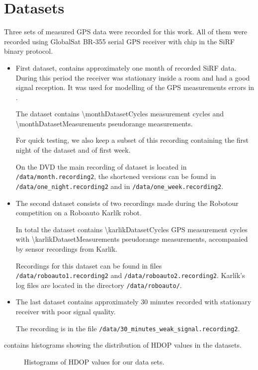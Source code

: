 \chapter{Datasets}
\label{chap:datasets}

Three sets of measured GPS data were recorded for this work.
All of them were recorded using GlobalSat BR-355 serial GPS receiver with \sirf chip
in the SiRF binary protocol.

\begin{itemize}

\item
First dataset,  contains approximately one month of recorded SiRF data.
During this period the receiver was stationary inside a room and had a good signal 
reception.
It was used for modelling of the GPS measurements errors in .

The dataset contains \num{\monthDatasetCycles} measurement cycles and
\num{\monthDatasetMeasurements} pseudorange measurements.

For quick testing, we also keep a subset of this recording containing the
first night of the dataset and of first week.

On the DVD the main recording of dataset is located in \verb=/data/month.recording2=,
the shortened versions can be found in \verb=/data/one_night.recording2= and in
\verb=/data/one_week.recording2=.

\item
The second dataset consists of two recordings made during
the Robotour competition \cite{robotour} on a Roboauto Karlík \cite{karlik} robot.

In total the dataset contains \num{\karlikDatasetCycles} GPS measurement cycles with
\num{\karlikDatasetMeasurements} pseudorange measurements, accompanied by sensor recordings from Karlík.

Recordings for this dataset can be found in files \verb=/data/roboauto1.recording2=
and \verb=/data/roboauto2.recording2=.
Karlík's log files are located in the directory \verb=/data/roboauto/=.

\item
The last dataset contains approximately
30 minutes recorded with stationary receiver with poor signal quality.

The recording is in the file \verb=/data/30_minutes_weak_signal.recording2=.

\end{itemize}

 contains histograms showing the distribution of HDOP values in the datasets.

\begin{figure}[htp]
	\centering
	\noindent{}
	\caption{Histograms of HDOP values for our data sets.}
	\label{fig:hdop-hist}
\end{figure}


